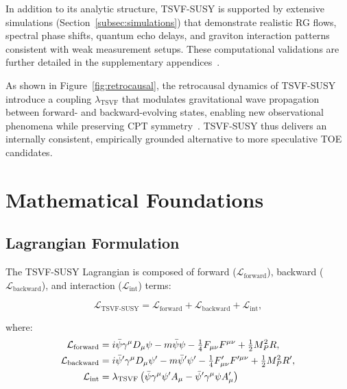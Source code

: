 \documentclass[twocolumn,superscriptaddress,floatfix]{revtex4-2}
\begin{document}
In addition to its analytic structure, TSVF-SUSY is supported by extensive simulations (Section~\ref{subsec:simulations}) that demonstrate realistic RG flows, spectral phase shifts, quantum echo delays, and graviton interaction patterns consistent with weak measurement setups. These computational validations are further detailed in the supplementary appendices~\cite{tsvf-susy-gw,tsvf-susy-darkenergy}.

As shown in Figure~\ref{fig:retrocausal}, the retrocausal dynamics of TSVF-SUSY introduce a coupling \(\lambda_{\text{TSVF}}\) that modulates gravitational wave propagation between forward- and backward-evolving states, enabling new observational phenomena while preserving CPT symmetry~\cite{Greenberg2002}. TSVF-SUSY thus delivers an internally consistent, empirically grounded alternative to more speculative TOE candidates.




\section{Mathematical Foundations}  
\label{sec:math}   

\subsection{Lagrangian Formulation}  
\label{subsec:lagrangian}    

The TSVF-SUSY Lagrangian is composed of forward ($\mathcal{L}_{\text{forward}}$), backward ($\mathcal{L}_{\text{backward}}$), and interaction ($\mathcal{L}_{\text{int}}$) terms:  

\begin{equation}  
\mathcal{L}_{\text{TSVF-SUSY}} = \mathcal{L}_{\text{forward}} + \mathcal{L}_{\text{backward}} + \mathcal{L}_{\text{int}},  
\label{eq:lagrangian_total}   
\end{equation}  

where:  
\begin{align}  
\mathcal{L}_{\text{forward}} &= i\bar{\psi}\gamma^\mu D_\mu\psi - m\bar{\psi}\psi  
                                - \tfrac{1}{4}F_{\mu\nu}F^{\mu\nu} + \tfrac{1}{2}M_P^2 R, \notag \\
\mathcal{L}_{\text{backward}} &= i\bar{\psi}'\gamma^\mu D_\mu\psi' - m\bar{\psi}'\psi'  
                                - \tfrac{1}{4}F'_{\mu\nu}F'^{\mu\nu} + \tfrac{1}{2}M_P^2 R', \notag \\
\mathcal{L}_{\text{int}} &= \lambda_{\text{TSVF}}\left(\bar{\psi}\gamma^\mu\psi' A_\mu  
                            - \bar{\psi}'\gamma^\mu\psi A'_\mu\right)  
\label{eq:lagrangian_terms}   
\end{align}   
\end{document}

